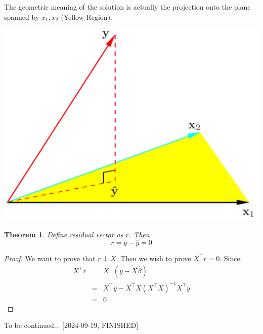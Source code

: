 \documentclass{article}
\theoremstyle{MyNonumberplain}
\theoremstyle{break}
\newtheorem*{proof}{Proof. }
\theoremstyle{break}
\newtheorem{theorem}{Theorem}[section]
\theoremstyle{break}
\theoremstyle{break}
\begin{document}
The geometric meaning of the solution is actually the projection onto the plane spanned by $x_1,x_2$ (Yellow Region). 
\begin{center}
    \includegraphics[scale=0.1]{Images/img9.png}
\end{center}

\begin{thmbox}
    \begin{theorem}
        Define residual vector as $r$. Then
        $$r=y-\hat{y}=0$$
    \end{theorem}
    \begin{prfbox}
        \begin{proof}
            We want to prove that $r\perp X$. Then we wish to prove $X^\intercal r=0$.
            Since:
            \begin{eqnarray*}
                X^\intercal r &=& X^\intercal (y-X\hat{\beta}) \\
                &=& X^\intercal y - X^\intercal X (X^\intercal X)^{-1} X^\intercal y\\
                &=& 0
            \end{eqnarray*}
        \end{proof}
    \end{prfbox}
\end{thmbox} 

To be continued... [2024-09-19, FINISHED]
\end{document}
